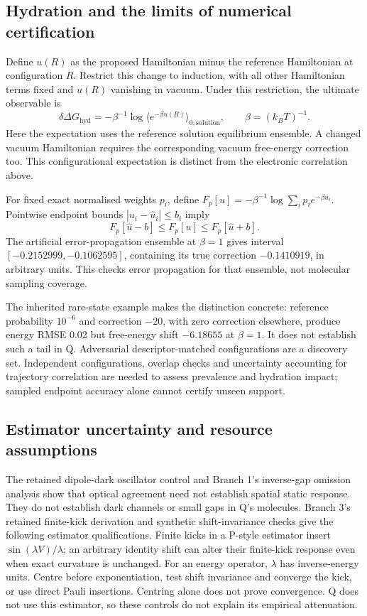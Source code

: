 \documentclass{article}
\begin{document}
\subsection{Hydration and the limits of numerical certification}

Define $u(R)$ as the proposed Hamiltonian minus the reference Hamiltonian at configuration $R$. Restrict this change to induction, with all other Hamiltonian terms fixed and $u(R)$ vanishing in vacuum. Under this restriction, the ultimate observable is
\begin{equation*}
\delta\Delta G_{\mathrm{hyd}}=-\beta^{-1}\log\langle e^{-\beta u(R)}\rangle_{0,\mathrm{solution}},\qquad \beta=(k_BT)^{-1}.
\end{equation*}
Here the expectation uses the reference solution equilibrium ensemble. A changed vacuum Hamiltonian requires the corresponding vacuum free-energy correction too. This configurational expectation is distinct from the electronic correlation above.

For fixed exact normalised weights $p_i$, define $F_p[u]=-\beta^{-1}\log\sum_i p_i e^{-\beta u_i}$. Pointwise endpoint bounds $|u_i-\widehat u_i|\le b_i$ imply
\begin{equation*}
F_p[\widehat u-b]\le F_p[u]\le F_p[\widehat u+b].
\end{equation*}
The artificial error-propagation ensemble at $\beta=1$ gives interval $[-0.2152999,-0.1062595]$, containing its true correction $-0.1410919$, in arbitrary units. This checks error propagation for that ensemble, not molecular sampling coverage.

The inherited rare-state example makes the distinction concrete: reference probability $10^{-6}$ and correction $-20$, with zero correction elsewhere, produce energy RMSE 0.02 but free-energy shift $-6.18655$ at $\beta=1$. It does not establish such a tail in Q. Adversarial descriptor-matched configurations are a discovery set. Independent configurations, overlap checks and uncertainty accounting for trajectory correlation are needed to assess prevalence and hydration impact; sampled endpoint accuracy alone cannot certify unseen support.

\subsection{Estimator uncertainty and resource assumptions}

The retained dipole-dark oscillator control and Branch 1's inverse-gap omission analysis show that optical agreement need not establish spatial static response. They do not establish dark channels or small gaps in Q's molecules. Branch 3's retained finite-kick derivation and synthetic shift-invariance checks give the following estimator qualifications. Finite kicks in a P-style estimator insert $\sin(\lambda V)/\lambda$; an arbitrary identity shift can alter their finite-kick response even when exact curvature is unchanged. For an energy operator, $\lambda$ has inverse-energy units. Centre before exponentiation, test shift invariance and converge the kick, or use direct Pauli insertions. Centring alone does not prove convergence. Q does not use this estimator, so these controls do not explain its empirical attenuation.
\end{document}
